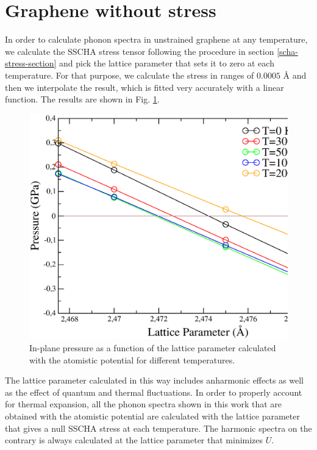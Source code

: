 \section{Graphene without stress}

In order to calculate phonon spectra in unstrained graphene at any temperature, we calculate the SSCHA stress tensor 
following the procedure in section \ref{scha-stress-section} and pick the lattice parameter that sets it to zero at 
each temperature. For that purpose, we calculate the stress in ranges of $0.0005$ \AA \hspace{0.1cm} and then we 
interpolate the result, which is fitted very accurately with a linear function. The results are shown in 
Fig. \ref{pressures}.
\begin{figure}[ht]
\includegraphics[width=0.99\linewidth]{Figures/pressures-graphene.eps}
        \caption[Pressure as a function of the lattice parameter in graphene]{In-plane pressure as a function of the 
	lattice parameter calculated with the atomistic potential for different temperatures.}
\label{pressures}
\end{figure}
The lattice parameter calculated in 
this way includes anharmonic effects as well as the effect of quantum and thermal fluctuations. In order to properly 
account for thermal expansion, all the phonon spectra shown in this work that are obtained with the atomistic 
potential are calculated with the lattice parameter that gives a null SSCHA stress at each temperature. The harmonic 
spectra on the contrary is always calculated at the lattice parameter that minimizes $U$. \\

